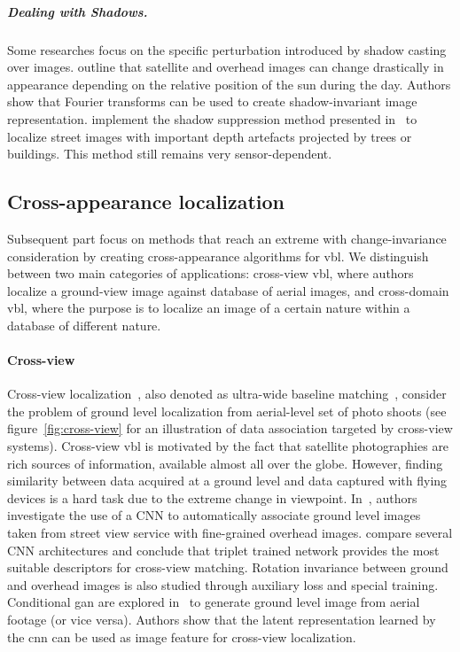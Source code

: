 			\subparagraph{Dealing with Shadows.}
				Some researches focus on the specific perturbation introduced by shadow casting over images. \citet{Wan2016} outline that satellite and overhead images can change drastically in appearance depending on the relative position of the sun during the day. Authors show that Fourier transforms can be used to create shadow-invariant image representation. \citet{Corke2013} implement the shadow suppression method presented in~\citep{Finlayson2006} to localize street images with important depth artefacts projected by trees or buildings. This method still remains very sensor-dependent.

	\subsection{Cross-appearance localization}
	\label{subsec:cross_domain}
		Subsequent part focus on methods that reach an extreme with change-invariance consideration by creating cross-appearance algorithms for \ac{vbl}. We distinguish between two main categories of applications: cross-view \ac{vbl}, where authors localize a ground-view image against database of aerial images, and cross-domain \ac{vbl}, where the purpose is to localize an image of a certain nature within a database of different nature.
		
		\paragraph{Cross-view}
			\label{para:cross_view}
			Cross-view localization~\citep{Lin2013,Workman2015,Castaldo2015,Vo2016,Tian2017}, also denoted as ultra-wide baseline matching~\citep{Bansal2012}, consider the problem of ground level localization from aerial-level set of photo shoots (see figure~\ref{fig:cross-view} for an illustration of data association targeted by cross-view systems). Cross-view \ac{vbl} is motivated by the fact that satellite photographies are rich sources of information, available almost all over the globe. However, finding similarity between data acquired at a ground level and data captured with flying devices is a hard task due to the extreme change in viewpoint. In~\citep{Workman2015,Vo2016}, authors investigate the use of a CNN to automatically associate ground level images taken from street view service with fine-grained overhead images. \citet{Vo2016} compare several CNN architectures and conclude that triplet trained network provides the most suitable descriptors for cross-view matching. Rotation invariance between ground and overhead images is also studied through auxiliary loss and special training. Conditional \ac{gan} are explored in~\citep{Regmi2018} to generate ground level image from aerial footage (or vice versa). Authors show that the latent representation learned by the \ac{cnn} can be used as image feature for cross-view localization.
						
